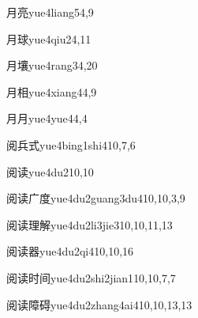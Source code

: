 \begin{entry}{月亮}{yue4liang5}{4,9}
\end{entry}

\begin{entry}{月球}{yue4qiu2}{4,11}
\end{entry}

\begin{entry}{月壤}{yue4rang3}{4,20}
\end{entry}

\begin{entry}{月相}{yue4xiang4}{4,9}
\end{entry}

\begin{entry}{月月}{yue4yue4}{4,4}
\end{entry}

\begin{entry}{阅兵式}{yue4bing1shi4}{10,7,6}
\end{entry}

\begin{entry}{阅读}{yue4du2}{10,10}
\end{entry}

\begin{entry}{阅读广度}{yue4du2guang3du4}{10,10,3,9}
\end{entry}

\begin{entry}{阅读理解}{yue4du2li3jie3}{10,10,11,13}
\end{entry}

\begin{entry}{阅读器}{yue4du2qi4}{10,10,16}
\end{entry}

\begin{entry}{阅读时间}{yue4du2shi2jian1}{10,10,7,7}
\end{entry}

\begin{entry}{阅读障碍}{yue4du2zhang4ai4}{10,10,13,13}
\end{entry}

